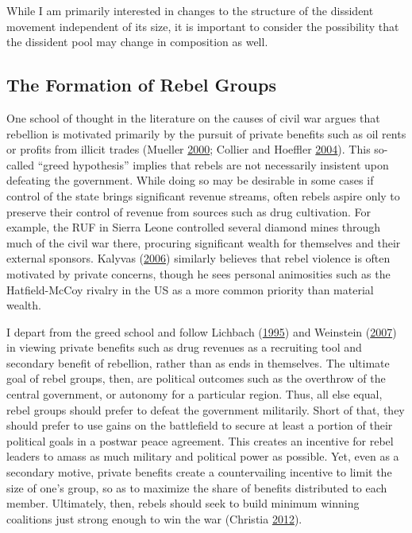 \documentclass[12pt,]{book}
\theoremstyle{definition}
\theoremstyle{definition}
\theoremstyle{definition}
\theoremstyle{remark}
\begin{document}
While I am primarily interested in changes to the structure of the
dissident movement independent of its size, it is important to consider
the possibility that the dissident pool may change in composition as
well.

\hypertarget{the-formation-of-rebel-groups}{%
\subsection{The Formation of Rebel
Groups}\label{the-formation-of-rebel-groups}}

One school of thought in the literature on the causes of civil war
argues that rebellion is motivated primarily by the pursuit of private
benefits such as oil rents or profits from illicit trades (Mueller
\protect\hyperlink{ref-mueller00}{2000}; Collier and Hoeffler
\protect\hyperlink{ref-Collier2004}{2004}). This so-called ``greed
hypothesis'' implies that rebels are not necessarily insistent upon
defeating the government. While doing so may be desirable in some cases
if control of the state brings significant revenue streams, often rebels
aspire only to preserve their control of revenue from sources such as
drug cultivation. For example, the RUF in Sierra Leone controlled
several diamond mines through much of the civil war there, procuring
significant wealth for themselves and their external sponsors. Kalyvas
(\protect\hyperlink{ref-Kalyvas2006}{2006}) similarly believes that
rebel violence is often motivated by private concerns, though he sees
personal animosities such as the Hatfield-McCoy rivalry in the US as a
more common priority than material wealth.

I depart from the greed school and follow Lichbach
(\protect\hyperlink{ref-Lichbach1995}{1995}) and Weinstein
(\protect\hyperlink{ref-Weinstein2007}{2007}) in viewing private
benefits such as drug revenues as a recruiting tool and secondary
benefit of rebellion, rather than as ends in themselves. The ultimate
goal of rebel groups, then, are political outcomes such as the overthrow
of the central government, or autonomy for a particular region. Thus,
all else equal, rebel groups should prefer to defeat the government
militarily. Short of that, they should prefer to use gains on the
battlefield to secure at least a portion of their political goals in a
postwar peace agreement. This creates an incentive for rebel leaders to
amass as much military and political power as possible. Yet, even as a
secondary motive, private benefits create a countervailing incentive to
limit the size of one's group, so as to maximize the share of benefits
distributed to each member. Ultimately, then, rebels should seek to
build minimum winning coalitions just strong enough to win the war
(Christia \protect\hyperlink{ref-Christia2012}{2012}).
\end{document}
